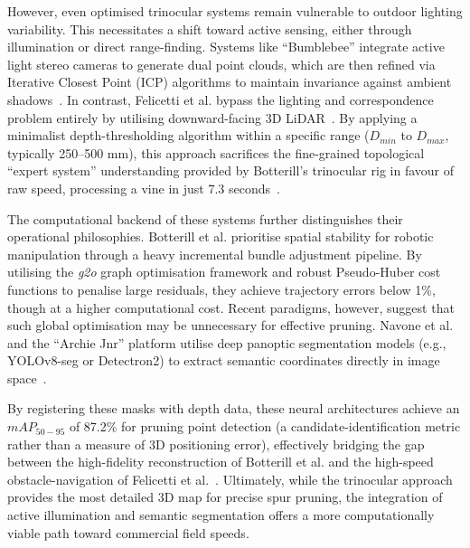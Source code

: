 However, even optimised trinocular systems remain vulnerable to outdoor lighting variability. This necessitates a shift toward active sensing, either through illumination or direct range-finding. Systems like ``Bumblebee'' integrate active light stereo cameras to generate dual point clouds, which are then refined via Iterative Closest Point (ICP) algorithms to maintain invariance against ambient shadows~\cite{navoneAutonomousRoboticPruning2025, silwalRobustIlluminationInvariantCamera2021}. In contrast, Felicetti et al. bypass the lighting and correspondence problem entirely by utilising downward-facing 3D LiDAR~\cite{felicettiTractorMountedGrapevine2025}. By applying a minimalist depth-thresholding algorithm within a specific range ($D_{min}$ to $D_{max}$, typically 250--500 mm), this approach sacrifices the fine-grained topological ``expert system'' understanding provided by Botterill's trinocular rig in favour of raw speed, processing a vine in just 7.3 seconds~\cite{felicettiTractorMountedGrapevine2025, botterillRobotSystemPruning2017}.

The computational backend of these systems further distinguishes their operational philosophies. Botterill et al. prioritise spatial stability for robotic manipulation through a heavy incremental bundle adjustment pipeline. By utilising the \textit{g2o} graph optimisation framework and robust Pseudo-Huber cost functions to penalise large residuals, they achieve trajectory errors below 1\%, though at a higher computational cost. Recent paradigms, however, suggest that such global optimisation may be unnecessary for effective pruning. Navone et al. and the ``Archie Jnr'' platform utilise deep panoptic segmentation models (e.g., YOLOv8-seg or Detectron2) to extract semantic coordinates directly in image space~\cite{navoneAutonomousRoboticPruning2025, hizatateDevelopmentRobotPruning2025}. 

By registering these masks with depth data, these neural architectures achieve an $mAP_{50-95}$ of 87.2\% for pruning point detection (a candidate-identification metric rather than a measure of 3D positioning error), effectively bridging the gap between the high-fidelity reconstruction of Botterill et al. and the high-speed obstacle-navigation of Felicetti et al.~\cite{botterillRobotSystemPruning2017, felicettiTractorMountedGrapevine2025, navoneAutonomousRoboticPruning2025}. Ultimately, while the trinocular approach provides the most detailed 3D map for precise spur pruning, the integration of active illumination and semantic segmentation offers a more computationally viable path toward commercial field speeds.

